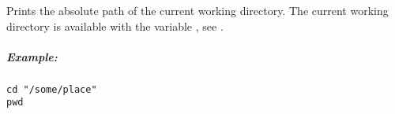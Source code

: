 \label{par:pwd}

Prints the absolute path of the current working directory. The current working
directory is available with the variable ,
see .

\subparagraph{Example:}

\begin{lstlisting}[style=Groovybash, label={lst:example_pwd}]
cd "/some/place"
pwd
\end{lstlisting}



